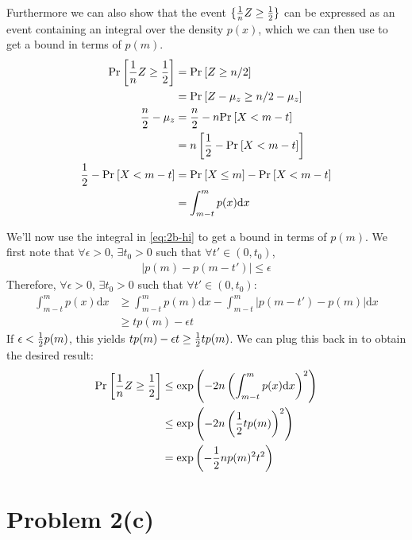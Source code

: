 \documentclass[11pt]{article}
\newcommand{\1}{\mathbb{I}} %
\begin{document}
Furthermore we can also show that the event $\{ \frac{1}{n}Z \geq \frac{1}{2} \} $ can be expressed as an event containing an integral over the density $p(x)$, which we can then use to get a bound in terms of $p(m)$. 
\begin{align}
	\text{Pr}_{}\left[\frac{1}{n} Z \geq \frac{1}{2}\right]
		&= \text{Pr}_{}\left[Z \geq n/2\right] \\
		&= \text{Pr}_{}\left[ Z - \mu_z \geq n/2 - \mu_z \right] \\
	\frac{n}{2} - \mu_z 
		&= \frac{n}{2} - n \text{Pr}_{}\left[X < m - t\right]  \\
		&= n \left[  \frac{1}{2} - \text{Pr}_{}\left[X < m - t\right] \right] \\
	\frac{1}{2} - \text{Pr}_{}\left[X < m - t\right]
		&= \text{Pr}_{}\left[X \leq  m\right] - \text{Pr}_{}\left[  X < m - t\right]\\
		&= \int_{m - t}^{m} p(x) \mathrm{d} x \label{eq:2b-hi}
\end{align}

We'll now use the integral in \ref{eq:2b-hi} to get a bound in terms of $p(m)$. We first note that $\forall \epsilon > 0$, $\exists t_0 > 0$ such that $\forall t' \in (0, t_0)$,
\begin{align}
	|  p(m) - p(m - t') | \leq \epsilon 
\end{align}
Therefore, $\forall \epsilon > 0$, $\exists t_0 > 0$ such that $\forall t' \in (0, t_0)$:
\begin{align}
	\int_{m - t}^{m} p(x) \mathrm{d} x  
		&\geq \int_{m - t}^{m} p(m) \mathrm{d} x  - \int_{m - t}^{m}  |p(m - t') - p(m) | \mathrm{d} x  \\
		&\geq tp(m) - \epsilon t
\end{align}
If $\epsilon < \frac{1}{2} p(m)$, this yields $tp(m) - \epsilon t \geq \frac{1}{2} t p(m)$. We can plug this back in to obtain the desired result:
\begin{align}
	\text{Pr}_{}\left[\frac{1}{n} Z  \geq \frac{1}{2} \right]
		&\leq \exp\left(  -2 n\left(   \int_{m - t}^{m} p(x) \mathrm{d} x      \right)^2   \right) \\
		&\leq \exp\left(   -2n \left(  \frac{1}{2} t p(m)  \right)^2   \right) \\
		&= \exp\left(   -\frac{1}{2} n p(m)^2 t^2  \right)
\end{align}

 

 
 
 \clearpage 
 \section*{Problem 2(c)}
 
\end{document}
